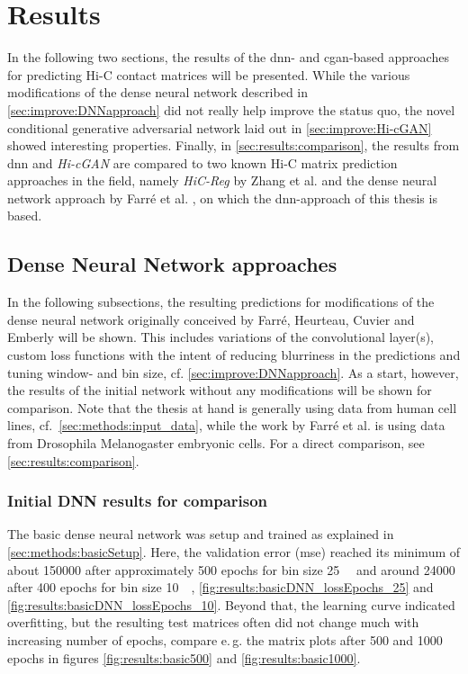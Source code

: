 %
\section{Results}
In the following two sections, 
the results of the \acrshort{dnn}- and \acrshort{cgan}-based approaches for predicting Hi-C contact matrices will be presented.
While the various modifications of the dense neural network described in \cref{sec:improve:DNNapproach} 
did  not really help improve the status quo, the novel conditional generative adversarial network laid out in \cref{sec:improve:Hi-cGAN}
showed interesting properties.
Finally, in \cref{sec:results:comparison}, the results from \acrshort{dnn} and \emph{Hi-cGAN} are compared to two known Hi-C matrix prediction approaches in the field,
namely \emph{HiC-Reg} by Zhang et al. \cite{Zhang2019} and the dense neural network approach by Farr\'e et al. \cite{Farre2018a},
on which the \acrshort{dnn}-approach of this thesis is based.

\subsection{Dense Neural Network approaches} \label{sec:results:DNN}
In the following subsections, the resulting predictions for modifications of the dense neural network originally conceived 
by Farr\'e, Heurteau, Cuvier and Emberly \cite{Farre2018a} will be shown. 
This includes variations of the convolutional layer(s), custom loss functions with the intent of reducing blurriness in the predictions
and tuning window- and bin size, cf. \cref{sec:improve:DNNapproach}.
As a start, however, the results of the initial network without any modifications will be shown for comparison.
Note that the thesis at hand is generally using data from human cell lines, cf.~\cref{sec:methods:input_data},
while the work by Farr\'e et al. is using data from Drosophila Melanogaster embryonic cells. 
For a direct comparison, see \cref{sec:results:comparison}.

\subsubsection{Initial DNN results for comparison} \label{sec:initialDNNresults}
The basic dense neural network was setup and trained as explained in \cref{sec:methods:basicSetup}.
Here, the validation error (\acrshort{mse}) reached its minimum of about \SI{150000}{} 
after approximately 500 epochs for bin size \SI{25}{\kilo\bp} and around \SI{24000}{} after 400 epochs for bin size \SI{10}{\kilo\bp}, \cref{fig:results:basicDNN_lossEpochs_25} and \ref{fig:results:basicDNN_lossEpochs_10}.
Beyond that, the learning curve indicated overfitting, but the resulting test matrices often did not change much with increasing number of epochs, 
compare e.\,g. the matrix plots after 500 and 1000 epochs in figures \ref{fig:results:basic500} and \ref{fig:results:basic1000}.

